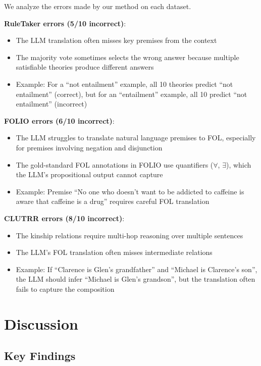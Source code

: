 \documentclass[11pt,letterpaper]{article}
\begin{document}
We analyze the errors made by our method on each dataset.

\textbf{RuleTaker errors (5/10 incorrect)}:
\begin{itemize}
    \item The LLM translation often misses key premises from the context
    \item The majority vote sometimes selects the wrong answer because multiple satisfiable theories produce different answers
    \item Example: For a ``not entailment'' example, all 10 theories predict ``not entailment'' (correct), but for an ``entailment'' example, all 10 predict ``not entailment'' (incorrect)
\end{itemize}

\textbf{FOLIO errors (6/10 incorrect)}:
\begin{itemize}
    \item The LLM struggles to translate natural language premises to FOL, especially for premises involving negation and disjunction
    \item The gold-standard FOL annotations in FOLIO use quantifiers ($\forall$, $\exists$), which the LLM's propositional output cannot capture
    \item Example: Premise ``No one who doesn't want to be addicted to caffeine is aware that caffeine is a drug'' requires careful FOL translation
\end{itemize}

\textbf{CLUTRR errors (8/10 incorrect)}:
\begin{itemize}
    \item The kinship relations require multi-hop reasoning over multiple sentences
    \item The LLM's FOL translation often misses intermediate relations
    \item Example: If ``Clarence is Glen's grandfather'' and ``Michael is Clarence's son'', the LLM should infer ``Michael is Glen's grandson'', but the translation often fails to capture the composition
\end{itemize}

\section{Discussion}
\label{sec:discussion}

\subsection{Key Findings}
\end{document}
